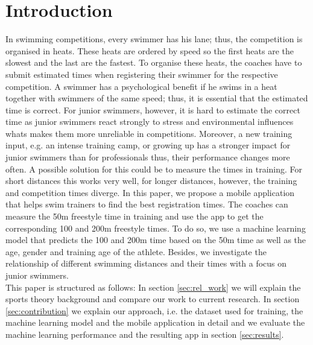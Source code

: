 \section{Introduction}


In swimming competitions, every swimmer has his lane; thus, the competition is organised in heats. These heats are ordered by speed so the first heats are the slowest and the last are the fastest. To organise these heats, the coaches have to submit estimated times when registering their swimmer for the respective competition. A swimmer has a psychological benefit if he swims in a heat together with swimmers of the same speed; thus, it is essential that the estimated time is correct. For junior swimmers, however, it is hard to estimate the correct time as junior swimmers react strongly to stress and environmental influences whats makes them more unreliable in competitions. Moreover, a new training input, e.g. an intense training camp, or growing up has a stronger impact for junior swimmers than for professionals thus, their performance changes more often. A possible solution for this could be to measure the times in training. For short distances this works very well, for longer distances, however, the training and competition times diverge. In this paper, we propose a mobile application that helps swim trainers to find the best registration times. The coaches can measure the 50m freestyle time in training and use the app to get the corresponding 100 and 200m freestyle times. To do so, we use a machine learning model that predicts the 100 and 200m time based on the 50m time as well as the age, gender and training age of the athlete. Besides, we investigate the relationship of different swimming distances and their times with a focus on junior swimmers.\\
This paper is structured as follows: In section \ref{sec:rel_work} we will explain the sports theory background and compare our work to current research. In section \ref{sec:contribution} we explain our approach, i.e. the dataset used for training, the machine learning model and the mobile application in detail and we evaluate the machine learning performance and the resulting app in section \ref{sec:results}.
